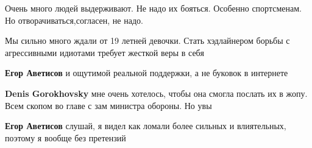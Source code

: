 \begin{itemize}
 
Очень много людей выдерживают.
Не надо их бояться.
Особенно спортсменам.
Но отворачиваться,согласен, не надо.

 
Мы сильно много ждали от 19 летней девочки.
Стать хэдлайнером борьбы с агрессивными идиотами требует жесткой веры в себя

\begin{itemize}
 

\textbf{Егор Аветисов} и ощутимой реальной поддержки, а не буковок в интернете

 
\textbf{Denis Gorokhovsky} мне очень хотелось, чтобы она смогла послать их в жопу. Всем скопом во главе с зам министра обороны.
Но увы

 

\textbf{Егор Аветисов} слушай, я видел как ломали более сильных и влиятельных, поэтому я вообще без претензий

 

\end{itemize}
\end{itemize}
